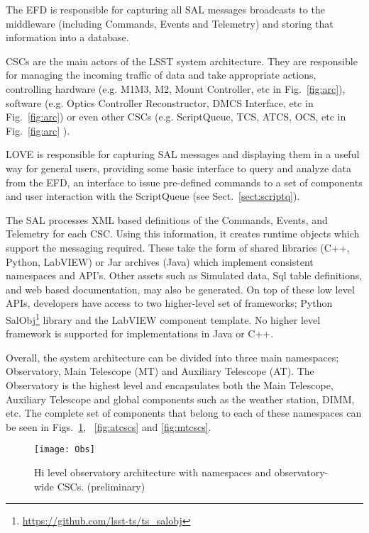 The EFD is responsible for capturing all SAL messages broadcasts to the middleware (including Commands, Events and Telemetry) and storing that information into a database.

CSCs are the main actors of the LSST system architecture. They are responsible for managing the incoming traffic of data and take appropriate actions, controlling hardware (e.g. M1M3, M2, Mount Controller, etc in Fig.~\ref{fig:arc}), software (e.g. Optics Controller Reconstructor, DMCS Interface, etc in Fig.~\ref{fig:arc}) or even other CSCs (e.g. ScriptQueue, TCS, ATCS, OCS, etc in Fig.~\ref{fig:arc} ).

LOVE is responsible for capturing SAL messages and displaying them in a useful way for general users, providing some basic interface to query and analyze data from the EFD, an interface to issue pre-defined commands to a set of components and user interaction with the ScriptQueue (see Sect.~\ref{sect:scriptq}).

The SAL processes XML based definitions of the Commands, Events, and Telemetry for each CSC. Using this information, it creates runtime objects which support the messaging required. These take the form of shared libraries (C++, Python, LabVIEW) or Jar archives (Java) which implement consistent namespaces and API's. Other assets such as Simulated data, Sql table definitions, and web based documentation, may also be generated. On top of these low level APIs, developers have access to two higher-level set of frameworks; Python SalObj\footnote{\url{https://github.com/lsst-ts/ts_salobj}} library and the LabVIEW component template. No higher level framework is supported for implementations in Java or C++.

Overall, the system architecture can be divided into three main namespaces; Observatory, Main Telescope (MT) and Auxiliary Telescope (AT). The Observatory is the highest level and encapsulates both the Main Telescope, Auxiliary Telescope and global components such as the weather station, DIMM, etc. The complete set of components that belong to each of these namespaces can be seen in Figs.~\ref{fig:ocs}, ~\ref{fig:atcscs} and \ref{fig:mtcscs}.

\begin{figure}
\begin{center}
\texttt{[image: Obs]}
\caption{Hi level observatory architecture with namespaces and observatory-wide CSCs. (preliminary)\label{fig:ocs}}
\end{center}
\end{figure}

